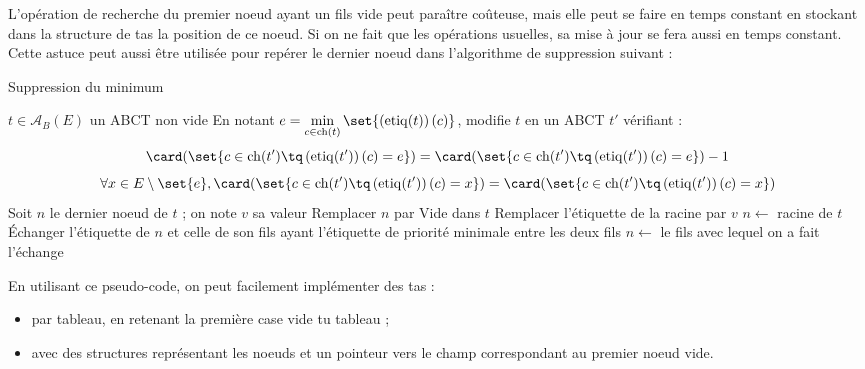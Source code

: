 \documentclass{scrartcl}
\begin{document}
			\rem L'opération de recherche du premier noeud ayant un fils vide peut paraître coûteuse, mais elle peut se faire en temps constant en stockant dans la structure de tas la position de ce noeud. Si on ne fait que les opérations usuelles, sa mise à jour se fera aussi en temps constant. Cette astuce peut aussi être utilisée pour repérer le dernier noeud dans l'algorithme de suppression suivant :

			\begin{algorithm}[H]
				\caption{Suppression du minimum}
				\Entree
				{
					$t \in \mathscr{A}_B(E)$ un ABCT non vide
				}
				\Sortie
				{
					En notant $e = \min\limits_{c \in \mathrm{ch}(t)} \set{\left(\mathrm{etiq}(t)\right)(c)}$,
					modifie $t$ en un ABCT $t'$ vérifiant :
					\[
						\card(\set{c \in \mathrm{ch}(t') \tq \left(\mathrm{etiq}(t')\right)(c) = e}) = \card(\set{c \in \mathrm{ch}(t') \tq \left(\mathrm{etiq}(t')\right)(c) = e}) - 1
					\]
					\[
						\forall x \in E\setminus\set{e}, \card(\set{c \in \mathrm{ch}(t') \tq \left(\mathrm{etiq}(t')\right)(c) = x}) = \card(\set{c \in \mathrm{ch}(t') \tq \left(\mathrm{etiq}(t')\right)(c) = x})
					\]
				}
				Soit $n$ le dernier noeud de $t$ ; on note $v$ sa valeur \;
				Remplacer $n$ par Vide dans $t$ \;
				Remplacer l'étiquette de la racine par $v$ \;
				$n \leftarrow$ racine de $t$ \;
				{
					Échanger l'étiquette de $n$ et celle de son fils ayant l'étiquette de priorité minimale entre les deux fils \;
					$n \leftarrow$ le fils avec lequel on a fait l'échange
				}
			\end{algorithm}

			En utilisant ce pseudo-code, on peut facilement implémenter des tas : 
			\begin{itemize}
				\item par tableau, en retenant la première case vide tu tableau ;
				\item avec des structures représentant les noeuds et un pointeur vers le champ correspondant au premier noeud vide.
			\end{itemize}
\end{document}
